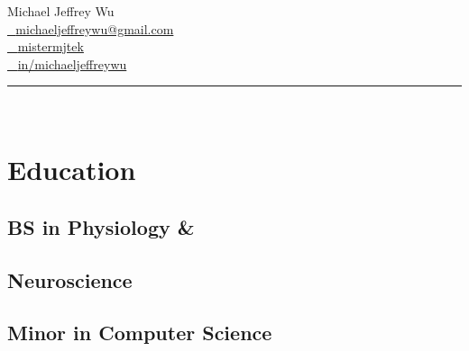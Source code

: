 \documentclass[]{deedy-resume-openfont}
\begin{document}
%
%

\lastupdated

%
%



%
%

\begin{minipage}[t]{0.33\textwidth} 

\vspace{1mm}

\fontsize{22pt}{15cm}\selectfont Michael Jeffrey Wu \vspace{-1mm}\\
\color{headings}\fontsize{11pt}{14pt}\selectfont 
\href{mailto:michaeljeffreywu@gmail.com}{{\FA \faEnvelope} \,\, {michaeljeffreywu@gmail.com}} \\
\href{https://github.com/mistermjtek}{{\FA \faGithubSign} \,\,\, {mistermjtek}} \\
\href{https://www.linkedin.com/in/michaeljeffreywu}{{\FA \faLinkedinSign} \,\,\, {in/michaeljeffreywu}} \vspace{3mm}\\
\rule{6.5cm}{0.4pt} \\
\vspace{-2mm}


\section{Education} 
\subsection{BS in Physiology \&}
\subsection{Neuroscience}
\sectionsep

\subsection{Minor in Computer Science}	
\sectionsep



\end{minipage}
\end{document}
